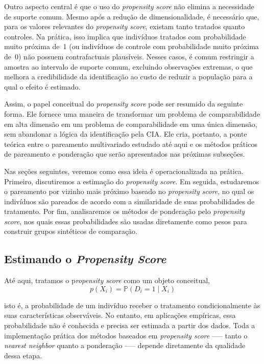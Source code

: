 Outro aspecto central é que o uso do \textit{propensity score} não elimina a necessidade de suporte comum. Mesmo após a redução de dimensionalidade, é necessário que, para os valores relevantes do \textit{propensity score}, existam tanto tratados quanto controles. Na prática, isso implica que indivíduos tratados com probabilidade muito próxima de~1 (ou indivíduos de controle com probabilidade muito próxima de~0) não possuem contrafactuais plausíveis. Nesses casos, é comum restringir a amostra ao intervalo de suporte comum, excluindo observações extremas, o que melhora a credibilidade da identificação ao custo de reduzir a população para a qual o efeito é estimado.


Assim, o papel conceitual do \textit{propensity score} pode ser resumido da seguinte forma. Ele fornece uma maneira de transformar um problema de comparabilidade em alta dimensão em um problema de comparabilidade em uma única dimensão, sem abandonar a lógica da identificação pela CIA. Ele cria, portanto, a ponte teórica entre o pareamento multivariado estudado até aqui e os métodos práticos de pareamento e ponderação que serão apresentados nas próximas subseções.

Nas seções seguintes, veremos como essa ideia é operacionalizada na prática. Primeiro, discutiremos a estimação do \textit{propensity score}. Em seguida, estudaremos o pareamento por vizinho mais próximo baseado no \textit{propensity score}, no qual os indivíduos são pareados de acordo com a similaridade de suas probabilidades de tratamento. Por fim, analisaremos os métodos de ponderação pelo \textit{propensity score}, nos quais essas probabilidades são usadas diretamente como pesos para construir grupos sintéticos de comparação.


\subsection{Estimando o \textit{Propensity Score}}

Até aqui, tratamos o p\textit{ropensity score} como um objeto conceitual,
$$
p(X_i) = \mathbb{P}(D_i = 1 \mid X_i)
$$

\noindent isto é, a probabilidade de um indivíduo receber o tratamento condicionalmente às suas características observáveis. No entanto, em aplicações empíricas, essa probabilidade não é conhecida e precisa ser estimada a partir dos dados. Toda a implementação prática dos métodos baseados em \textit{propensity score} —-- tanto o \textit{nearest neighbor} quanto a ponderação —-- depende diretamente da qualidade dessa etapa.

